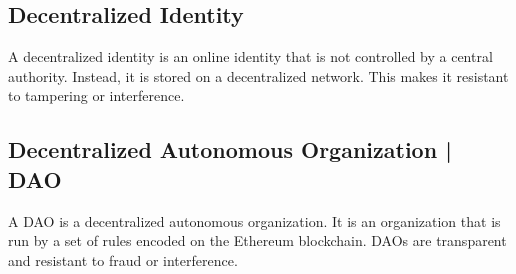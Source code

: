\subsection{Decentralized Identity}
A decentralized identity is an online identity that is not controlled by a central authority. Instead, it is stored on a decentralized network. This makes it resistant to tampering or interference.

\subsection{Decentralized Autonomous Organization | DAO}
A DAO is a decentralized autonomous organization. It is an organization that is run by a set of rules encoded on the Ethereum blockchain. DAOs are transparent and resistant to fraud or interference.




